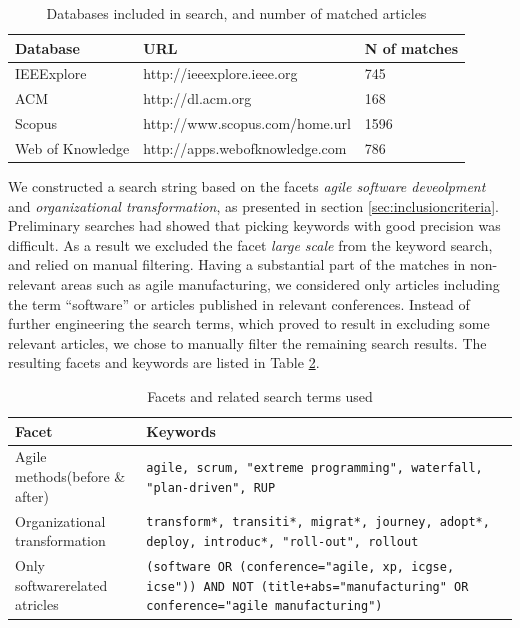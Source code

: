 \documentclass[preprint,authoryear,12pt]{elsarticle}
\begin{document}
\begin{table}
    \begin{tabular}{ p{} l l }
        \toprule
        Database         & URL                         & N of matches   \\
        \midrule
        IEEExplore       & http://ieeexplore.ieee.org      & 745 \\ 
        ACM              & http://dl.acm.org               & 168 \\
        Scopus           & http://www.scopus.com/home.url  & 1596 \\
        Web of Knowledge & http://apps.webofknowledge.com  & 786 \\
        \bottomrule
    \end{tabular}
    \caption{Databases included in search, and number of matched articles}
    \label{table:databases}
\end{table}

We constructed a search string based on the facets \emph{agile software
deveolpment} and \emph{organizational transformation}, as presented in section
\ref{sec:inclusioncriteria}. Preliminary searches had showed that picking
keywords with good precision was difficult. As a result we excluded the facet
\emph{large scale} from the keyword search, and relied on manual filtering.
Having a substantial part of the matches in non-relevant areas such as agile
manufacturing, we considered only articles including the term ``software'' or
articles published in relevant conferences. Instead of further engineering the
search terms, which proved to result in excluding some relevant articles, we
chose to manually filter the remaining search results. The resulting facets and
keywords are listed in Table \ref{table:searchterms}.

\begin{table}
    \begin{tabular}{ p{} p{} }
        \toprule
        Facet                  & Keywords   \\
        \midrule
        Agile methods\newline (before \& after) &
            \texttt{agile, scrum, "extreme programming",
            waterfall, "plan-driven", RUP}\\
        Organizational transformation &
            \texttt{transform*, transiti*, migrat*, journey, adopt*, deploy, introduc*,
            "roll-out", rollout}\\
        Only software\newline related atricles &
            \texttt{(software OR (conference="agile, xp, icgse, icse"))
            AND NOT (title+abs="manufacturing" OR conference="agile manufacturing")}
        \\
        \bottomrule
    \end{tabular}
    \caption{Facets and related search terms used}
    \label{table:searchterms}
\end{table}
\end{document}
